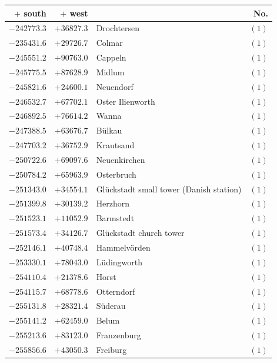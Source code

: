 \clearpage{}%
\begin{center}\begingroup\fontsize{8}{9}\selectfont
\setlength{\tabcolsep}{4pt}
\begin{tabular}{r|r|p{170pt}|r}\hline
\(+\) south&\(+\) west&&No.\\\hline
\(-242773.3\)&\(+36827.3\)&Drochtersen&\((1)\)\\
\(-235431.6\)&\(+29726.7\)&Colmar&\((1)\)\\
\(-245551.2\)&\(+90763.0\)&Cappeln&\((1)\)\\
\(-245775.5\)&\(+87628.9\)&Midlum&\((1)\)\\
\(-245821.6\)&\(+24600.1\)&Neuendorf&\((1)\)\\
\(-246532.7\)&\(+67702.1\)&Oster Ilienworth&\((1)\)\\
\(-246892.5\)&\(+76614.2\)&Wanna&\((1)\)\\
\(-247388.5\)&\(+63676.7\)&Bülkau&\((1)\)\\
\(-247703.2\)&\(+36752.9\)&Krautsand&\((1)\)\\
\(-250722.6\)&\(+69097.6\)&Neuenkirchen&\((1)\)\\
\(-250784.2\)&\(+65963.9\)&Osterbruch&\((1)\)\\
\(-251343.0\)&\(+34554.1\)&Glückstadt small tower (Danish station)&\((1)\)\\
\(-251399.8\)&\(+30139.2\)&Herzhorn&\((1)\)\\
\(-251523.1\)&\(+11052.9\)&Barmstedt&\((1)\)\\
\(-251573.4\)&\(+34126.7\)&Glückstadt church tower&\((1)\)\\
\(-252146.1\)&\(+40748.4\)&Hammelvörden&\((1)\)\\
\(-253330.1\)&\(+78043.0\)&Lüdingworth&\((1)\)\\
\(-254110.4\)&\(+21378.6\)&Horst&\((1)\)\\
\(-254115.7\)&\(+68778.6\)&Otterndorf&\((1)\)\\
\(-255131.8\)&\(+28321.4\)&Süderau&\((1)\)\\
\(-255141.2\)&\(+62459.0\)&Belum&\((1)\)\\
\(-255213.6\)&\(+83123.0\)&Franzenburg&\((1)\)\\
\(-255856.6\)&\(+43050.3\)&Freiburg&\((1)\)\\
\hline\end{tabular}\endgroup\end{center}
\clearpage
